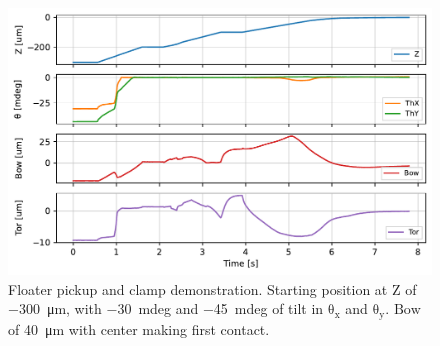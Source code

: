 \documentclass[letterpaper,10pt,onecolumn]{aspe}
\begin{document}

\begin{figure}[!b]
    \centering
    \includegraphics[width=0.9\linewidth]{floater_pickup_clamp.pdf}
    \caption[]{Floater pickup and clamp demonstration. Starting position at \(\mathrm{Z}\) of \SI{-300}{\micro \metre}, with \SI{-30}{\milli deg} and \SI{-45}{\milli deg} of tilt in \(\mathrm{\theta_x}\) and \(\mathrm{\theta_y}\). \(\mathrm{Bow}\) of \SI{40}{\micro \metre} with center making first contact. }\label{fig:floater_pickup_clamp}
\end{figure}

\newpage


\end{document}
